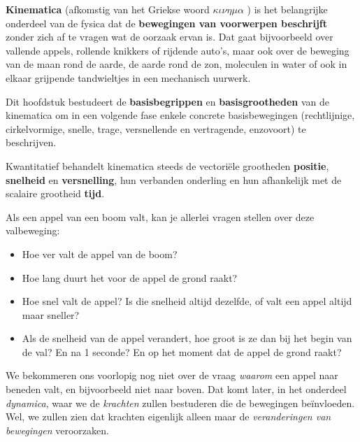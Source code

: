 \documentclass{ximera}
\begin{document}
	\author{Bart Lambregs, Vincent Gellens}
    \xmsource\xmuitleg

\textbf{Kinematica} (afkomstig van het Griekse woord $\kappa \iota \nu \eta \mu \alpha$ ) is het belangrijke onderdeel van de fysica dat de \textbf{bewegingen van voorwerpen beschrijft} zonder zich af te vragen wat de oorzaak ervan is. 
Dat gaat bijvoorbeeld over vallende appels, rollende knikkers of rijdende auto's, maar ook over de beweging van de maan rond de aarde, de aarde rond de zon, moleculen in water of ook in elkaar grijpende tandwieltjes in een mechanisch uurwerk. 


Dit hoofdstuk bestudeert de \textbf{basisbegrippen} en \textbf{basisgrootheden}  van de kinematica om in een volgende fase enkele concrete basisbewegingen (rechtlijnige, cirkelvormige, snelle, trage, versnellende en vertragende, enzovoort) te beschrijven.

Kwantitatief behandelt kinematica steeds de vectoriële grootheden \textbf{positie}, \textbf{snelheid} en \textbf{versnelling}, hun verbanden onderling en hun afhankelijk met de scalaire grootheid \textbf{tijd}.

\begin{example}
Als een appel van een boom valt, kan je allerlei vragen stellen over deze valbeweging: 

\begin{itemize}
	\item Hoe ver valt de appel van de boom?
	\item Hoe lang duurt het voor de appel de grond raakt? 
	\item Hoe snel valt de appel? Is die snelheid altijd dezelfde, of valt een appel altijd maar sneller? 
	\item Als de snelheid van de appel verandert, hoe groot is ze dan bij het begin van de val? En na 1 seconde? En op het moment dat de appel de grond raakt? 
\end{itemize}

We bekommeren ons voorlopig nog niet over de vraag \textit{waarom} een appel naar beneden valt, en bijvoorbeeld niet naar boven.
Dat komt later, in het onderdeel \textit{dynamica}, waar we de \textit{krachten} zullen bestuderen die de bewegingen beïnvloeden. Wel, we zullen zien dat krachten eigenlijk alleen maar de \textit{veranderingen van bewegingen} veroorzaken.

\end{example}
\end{document}
